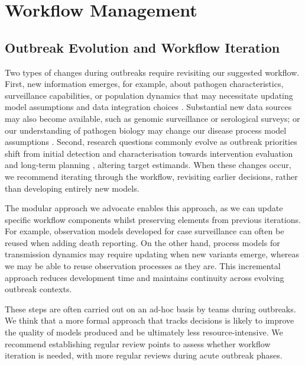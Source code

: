 \documentclass{article}
\begin{document}
\section{Workflow Management}

\subsection{Outbreak Evolution and Workflow Iteration}  \label{sec:outbreak}
Two types of changes during outbreaks require revisiting our suggested workflow.
First, new information emerges, for example, about pathogen characteristics, surveillance capabilities, or population dynamics that may necessitate updating model assumptions and data integration choices \citep{mccaw2023role}. Substantial new data sources may also become available, such as genomic surveillance or serological surveys; or our understanding of pathogen biology may change our disease process model assumptions \citep{knock2021key}. 
Second, research questions commonly evolve as outbreak priorities shift from initial detection and characterisation towards intervention evaluation and long-term planning \citep{who-mosaic-2023}, altering target estimands.
When these changes occur, we recommend iterating through the workflow, revisiting earlier decisions, rather than developing entirely new models.

The modular approach we advocate enables this approach, as we can update specific workflow components whilst preserving elements from previous iterations.
For example, observation models developed for case surveillance can often be reused when adding death reporting. On the other hand, process models for transmission dynamics may require updating when new variants emerge, whereas we may be able to reuse observation processes as they are.
This incremental approach reduces development time and maintains continuity across evolving outbreak contexts.

These steps are often carried out on an ad-hoc basis by teams during outbreaks.
We think that a more formal approach that tracks decisions is likely to improve the quality of models produced and be ultimately less resource-intensive.
We recommend establishing regular review points to assess whether workflow iteration is needed, with more regular reviews during acute outbreak phases.
\end{document}
